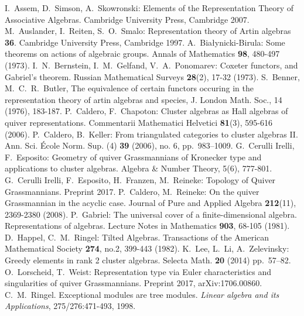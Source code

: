 \documentclass{amsart}
\newcommand{\sayT}[1]{\say[T]{#1}}
\numberwithin{equation}{section}
\begin{document}
\sayT{references to be unified}
\begin{thebibliography}{10}

  I.~Assem, D.~Simson, A.~Skowronski: Elements of the Representation Theory of Associative Algebras. Cambridge University Press, Cambridge 2007.
  M.~Auslander, I.~Reiten, S.~O.~Smalo: Representation theory of Artin algebras {\bf 36}. Cambridge University Press, Cambridge 1997.
  A.~Bia\l{}ynicki-Birula: Some theorems on actions of algebraic groups. Annals of Mathematics \textbf{98}, 480-497 (1973).
  I.~N.~Bernstein, I.~M.~Gelfand, V.~A.~Ponomarev: Coxeter functors, and Gabriel's theorem. Russian Mathematical Surveys \textbf{28}(2), 17-32 (1973).
  S.~Benner, M.~C.~R.~Butler, The equivalence of certain functors occuring in the representation theory of artin algebras and species, J. London Math. Soc., 14 (1976), 183-187.
  P.~Caldero, F.~Chapoton: Cluster algebras as {H}all algebras of quiver representations. Commentarii Mathematici Helvetici \textbf{81}(3), 595-616 (2006).
  P.~Caldero, B.~Keller: From triangulated categories to cluster algebras II.  Ann. Sci. \'Ecole Norm. Sup. (4) \textbf{39} (2006), no. 6, pp.~983--1009.
  G.~Cerulli Irelli, F.~Esposito: Geometry of quiver Grassmannians of Kronecker type and applications to cluster algebras. Algebra \&  Number Theory, 5(6), 777-801.
  G.~Cerulli Irelli, F.~Esposito, H.~Franzen, M.~Reineke: Topology of Quiver Grassmannians. Preprint 2017.
  P.~Caldero, M.~Reineke: On the quiver Grassmannian in the acyclic case. Journal of Pure and Applied Algebra \textbf{212}(11), 2369-2380 (2008).
  P.~Gabriel: The universal cover of a finite-dimensional algebra. Representations of algebras. Lecture Notes in Mathematics {\bf 903}, 68-105 (1981).
  D.~Happel, C.~M.~Ringel: Tilted Algebras. Transactions of the American Mathematical Society {\bf 274}, no.2, 399-443 (1982).
  K.~Lee, L.~Li, A.~Zelevinsky: Greedy elements in rank 2 cluster algebras. Selecta Math. \textbf{20} (2014) pp.~57--82.
  O.~Lorscheid, T.~Weist: Representation type via Euler characteristics and singularities of quiver Grassmannians. Preprint 2017, arXiv:1706.00860.
  C.~M.~Ringel. Exceptional modules are tree modules. \textit{Linear algebra and its Applications}, 275/276:471-493, 1998.

\end{thebibliography}
\end{document}
